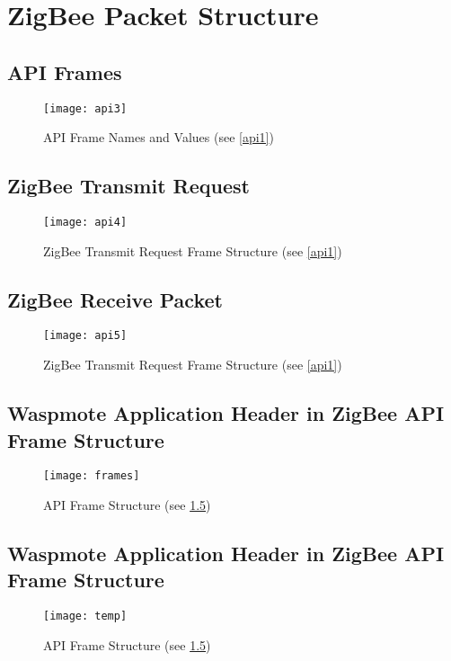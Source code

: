 \clearpage
\section{ZigBee Packet Structure }
\label{AppendixF} %

\subsection{API Frames}
\begin{figure}[htbp]
\centering
\texttt{[image: api3]}
\caption{API Frame Names and Values (see \ref{api1})}
\label{fig:api3 }
\end{figure}

\subsection{ZigBee Transmit Request}
\begin{figure}[htbp]
\centering
\texttt{[image: api4]}
\caption{ZigBee Transmit Request Frame Structure (see \ref{api1})}
\label{fig:api4}
\end{figure}

\subsection{ZigBee Receive Packet}
\begin{figure}[htbp]
\centering
\texttt{[image: api5]}
\caption{ZigBee Transmit Request Frame Structure (see \ref{api1})}
\label{fig:api5}
\end{figure}

\subsection{Waspmote Application Header in ZigBee API Frame Structure }
\begin{figure}[htbp]
\centering
\texttt{[image: frames]}
\caption{API Frame Structure (see \ref{})}
\label{fig:frames}
\end{figure}

\subsection{Waspmote Application Header in ZigBee API Frame Structure }
\begin{figure}[htbp]
\centering
\texttt{[image: temp]}
\caption{API Frame Structure (see \ref{})}
\label{fig:frames}
\end{figure}